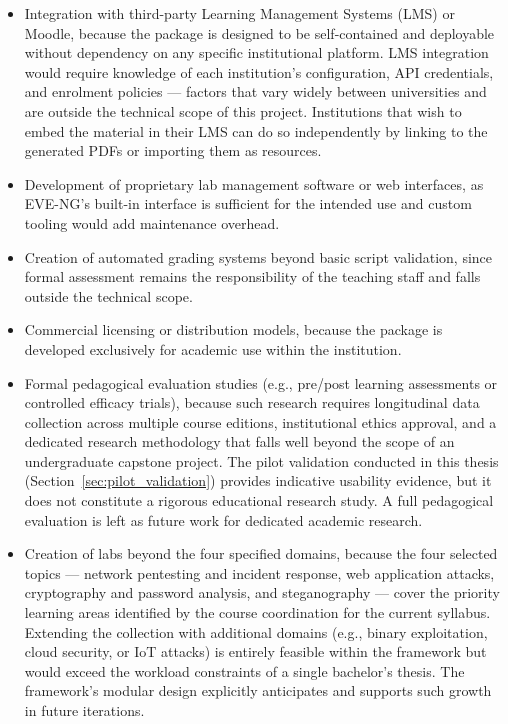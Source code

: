 \begin{itemize}
    \item Integration with third-party Learning Management Systems (LMS) or
          Moodle, because the package is designed to be self-contained and
          deployable without dependency on any specific institutional platform.
          LMS integration would require knowledge of each institution's
          configuration, API credentials, and enrolment policies --- factors
          that vary widely between universities and are outside the technical
          scope of this project. Institutions that wish to embed the material
          in their LMS can do so independently by linking to the generated PDFs
          or importing them as resources.
    \item Development of proprietary lab management software or web
          interfaces, as EVE-NG's built-in interface is sufficient for the
          intended use and custom tooling would add maintenance overhead.
    \item Creation of automated grading systems beyond basic script
          validation, since formal assessment remains the responsibility of
          the teaching staff and falls outside the technical scope.
    \item Commercial licensing or distribution models, because the package
          is developed exclusively for academic use within the institution.
    \item Formal pedagogical evaluation studies
          (e.g., pre/post learning assessments or controlled efficacy trials),
          because such research requires longitudinal data collection across
          multiple course editions, institutional ethics approval, and a
          dedicated research methodology that falls well beyond the scope of
          an undergraduate capstone project. The pilot validation conducted in
          this thesis (Section~\ref{sec:pilot_validation}) provides indicative
          usability evidence, but it does not constitute a rigorous educational
          research study. A full pedagogical evaluation is left as future work
          for dedicated academic research.
    \item Creation of labs beyond the four specified domains, because the
          four selected topics --- network pentesting and incident response,
          web application attacks, cryptography and password analysis, and
          steganography --- cover the priority learning areas identified by
          the course coordination for the current syllabus. Extending the
          collection with additional domains (e.g., binary exploitation,
          cloud security, or IoT attacks) is entirely feasible within the
          framework but would exceed the workload constraints of a single
          bachelor's thesis. The framework's modular design explicitly
          anticipates and supports such growth in future iterations.
\end{itemize}
\newpage
